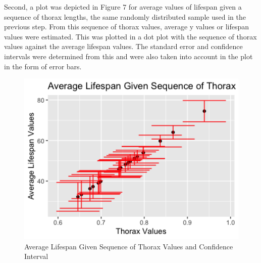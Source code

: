 \documentclass[12pt,letterpaper]{article}
\begin{document}
\begin{enumerate}
	\vspace{.5cm}
	
	Second, a plot was depicted in Figure 7 for average values of lifespan given a sequence of thorax lengths, the same randomly distributed sample used in the previous step. From this sequence of thorax values, average y values or lifespan values were estimated. This was plotted in a dot plot with the sequence of thorax values against the average lifespan values. The standard error and confidence intervals were determined from this and were also taken into account in the plot in the form of error bars.
	
	
	
	\begin{figure}[h!]
		\caption{\footnotesize{Average Lifespan Given Sequence of Thorax Values and Confidence Interval}}
		\vspace{.5cm}
		\centering
		\label{fig:confidenceintervals}
		\includegraphics[width=1\textwidth]{./PS2_Graph_6.png}
	\end{figure}	
	
	



\end{enumerate}
\end{document}
